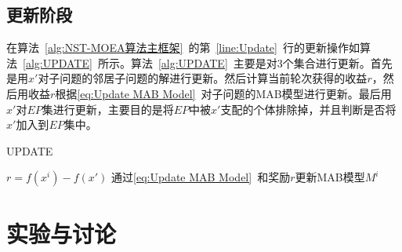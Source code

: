 \subsection{更新阶段}
\label{subsec:NST:算法设计:更新阶段}
在算法~\ref{alg:NST-MOEA算法主框架}~的第~\ref{line:Update}~行的更新操作如算法~\ref{alg:UPDATE}~所示。算法~\ref{alg:UPDATE}~主要是对3个集合进行更新。首先是用$x'$对子问题的邻居子问题的解进行更新。然后计算当前轮次获得的收益$r$，然后用收益$r$根据\autoref{eq:Update MAB Model}~对子问题的MAB模型进行更新。最后用$x'$对$EP$集进行更新，主要目的是将$EP$中被$x'$支配的个体排除掉，并且判断是否将$x'$加入到$EP$集中。
\par
\begin{algorithm}
    \caption{UPDATE}
    \label{alg:UPDATE}
    \BlankLine
    $r = f(x^i)-f(x')$ \;
    通过\autoref{eq:Update MAB Model}~和奖励$r$更新MAB模型$M^i$ \;
\end{algorithm}

\section{实验与讨论}
\label{sec:NST:实验与讨论}

